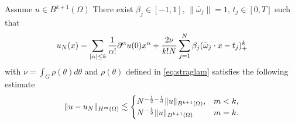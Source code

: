 \begin{theorem}\label{est:stratify}
Assume $u\in B^{k+1}(\Omega)$
There exist $\beta_j\in [-1, 1]$, $\|\bar \omega_j\|=1$, $t_j\in [0,T]$ such that 
\begin{equation}
u_N(x)= \sum_{|\alpha|\le k}{1\over \alpha!} \partial^\alpha u(0) x^\alpha + {2\nu\over k!N}\sum_{j=1}^{N}\beta_j (\bar \omega_j\cdot x - t_j)_+^k
\end{equation} 
with $\nu=\int_G \rho(\theta)d\theta$ and $\rho(\theta)$  defined in \eqref{eq:straglam} 
satisfies the following estimate
\begin{equation}
\|u - u_N \|_{H^m(\Omega)} \lesssim  
\begin{cases}
 N^{-{1\over 2}-{1\over d}}\|u\|_{B^{k+1}(\Omega)},&m< k,
\\
N^{-{1\over 2}}\|u\|_{B^{k+1}(\Omega)}& m=k.
\end{cases} 
\end{equation} 
\end{theorem}

